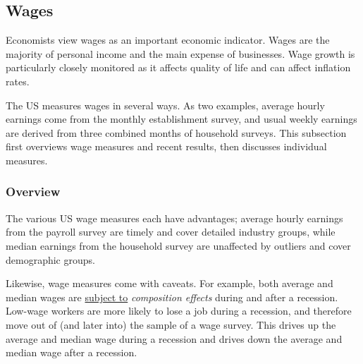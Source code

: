 \subsection*{Wages}
\begin{minipage}{0.76\textwidth}  
 \hypertarget{labw}{\label{labw}}
\small Economists view wages as an important economic indicator. Wages are the majority of personal income and the main expense of businesses. Wage growth is particularly closely monitored as it affects quality of life and can affect inflation rates. 

The US measures wages in several ways. As two examples, average hourly earnings come from the monthly establishment survey, and usual weekly earnings are derived from three combined months of household surveys. This subsection first overviews wage measures and recent results, then discusses individual measures. 
\vspace{-2mm}

\subsubsection*{Overview}
\vspace*{-1mm}

\small The various US wage measures each have advantages; average hourly earnings from the payroll survey are timely and cover detailed industry groups, while median earnings from the household survey are unaffected by outliers and cover demographic groups. 

Likewise, wage measures come with caveats. For example, both average and median wages are \href{https://www.dallasfed.org/research/economics/2022/0215}{subject to} \textit{composition effects} during and after a recession. Low-wage workers are more likely to lose a job during a recession, and therefore move out of (and later into) the sample of a wage survey. This drives up the average and median wage during a recession and drives down the average and median wage after a recession. 
\end{minipage}


